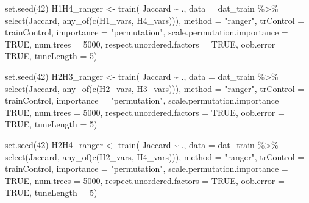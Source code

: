 \documentclass[
  letterpaper,
  DIV=11,
  numbers=noendperiod]{scrartcl}
\newenvironment{Shaded}{\begin{snugshade}}{\end{snugshade}}
\newcommand{\AttributeTok}[1]{\textcolor[rgb]{0.40,0.45,0.13}{#1}}
\newcommand{\ConstantTok}[1]{\textcolor[rgb]{0.56,0.35,0.01}{#1}}
\newcommand{\DecValTok}[1]{\textcolor[rgb]{0.68,0.00,0.00}{#1}}
\newcommand{\FunctionTok}[1]{\textcolor[rgb]{0.28,0.35,0.67}{#1}}
\newcommand{\NormalTok}[1]{\textcolor[rgb]{0.00,0.23,0.31}{#1}}
\newcommand{\OtherTok}[1]{\textcolor[rgb]{0.00,0.23,0.31}{#1}}
\newcommand{\SpecialCharTok}[1]{\textcolor[rgb]{0.37,0.37,0.37}{#1}}
\newcommand{\StringTok}[1]{\textcolor[rgb]{0.13,0.47,0.30}{#1}}
\begin{document}
\begin{Shaded}
\begin{Highlighting}[]
\FunctionTok{set.seed}\NormalTok{(}\DecValTok{42}\NormalTok{)}
\NormalTok{H1H4\_ranger }\OtherTok{\textless{}{-}} \FunctionTok{train}\NormalTok{(}
\NormalTok{    Jaccard }\SpecialCharTok{\textasciitilde{}}\NormalTok{ .,}
    \AttributeTok{data =}\NormalTok{ dat\_train }\SpecialCharTok{\%\textgreater{}\%} \FunctionTok{select}\NormalTok{(Jaccard, }\FunctionTok{any\_of}\NormalTok{(}\FunctionTok{c}\NormalTok{(H1\_vars, H4\_vars))),}
    \AttributeTok{method =} \StringTok{"ranger"}\NormalTok{,}
    \AttributeTok{trControl =}\NormalTok{ trainControl,}
    \AttributeTok{importance =} \StringTok{"permutation"}\NormalTok{,}
    \AttributeTok{scale.permutation.importance =} \ConstantTok{TRUE}\NormalTok{,}
    \AttributeTok{num.trees =} \DecValTok{5000}\NormalTok{,}
    \AttributeTok{respect.unordered.factors =} \ConstantTok{TRUE}\NormalTok{,}
    \AttributeTok{oob.error =} \ConstantTok{TRUE}\NormalTok{,}
    \AttributeTok{tuneLength =} \DecValTok{5}\NormalTok{)}


\FunctionTok{set.seed}\NormalTok{(}\DecValTok{42}\NormalTok{)}
\NormalTok{H2H3\_ranger }\OtherTok{\textless{}{-}} \FunctionTok{train}\NormalTok{(}
\NormalTok{    Jaccard }\SpecialCharTok{\textasciitilde{}}\NormalTok{ .,}
    \AttributeTok{data =}\NormalTok{ dat\_train }\SpecialCharTok{\%\textgreater{}\%} \FunctionTok{select}\NormalTok{(Jaccard, }\FunctionTok{any\_of}\NormalTok{(}\FunctionTok{c}\NormalTok{(H2\_vars, H3\_vars))),}
    \AttributeTok{method =} \StringTok{"ranger"}\NormalTok{,}
    \AttributeTok{trControl =}\NormalTok{ trainControl,}
    \AttributeTok{importance =} \StringTok{"permutation"}\NormalTok{,}
    \AttributeTok{scale.permutation.importance =} \ConstantTok{TRUE}\NormalTok{,}
    \AttributeTok{num.trees =} \DecValTok{5000}\NormalTok{,}
    \AttributeTok{respect.unordered.factors =} \ConstantTok{TRUE}\NormalTok{,}
    \AttributeTok{oob.error =} \ConstantTok{TRUE}\NormalTok{,}
    \AttributeTok{tuneLength =} \DecValTok{5}\NormalTok{)}


\FunctionTok{set.seed}\NormalTok{(}\DecValTok{42}\NormalTok{)}
\NormalTok{H2H4\_ranger }\OtherTok{\textless{}{-}} \FunctionTok{train}\NormalTok{(}
\NormalTok{    Jaccard }\SpecialCharTok{\textasciitilde{}}\NormalTok{ .,}
    \AttributeTok{data =}\NormalTok{ dat\_train }\SpecialCharTok{\%\textgreater{}\%} \FunctionTok{select}\NormalTok{(Jaccard, }\FunctionTok{any\_of}\NormalTok{(}\FunctionTok{c}\NormalTok{(H2\_vars, H4\_vars))),}
    \AttributeTok{method =} \StringTok{"ranger"}\NormalTok{,}
    \AttributeTok{trControl =}\NormalTok{ trainControl,}
    \AttributeTok{importance =} \StringTok{"permutation"}\NormalTok{,}
    \AttributeTok{scale.permutation.importance =} \ConstantTok{TRUE}\NormalTok{,}
    \AttributeTok{num.trees =} \DecValTok{5000}\NormalTok{,}
    \AttributeTok{respect.unordered.factors =} \ConstantTok{TRUE}\NormalTok{,}
    \AttributeTok{oob.error =} \ConstantTok{TRUE}\NormalTok{,}
    \AttributeTok{tuneLength =} \DecValTok{5}\NormalTok{)}


\end{Highlighting}
\end{Shaded}
\end{document}

